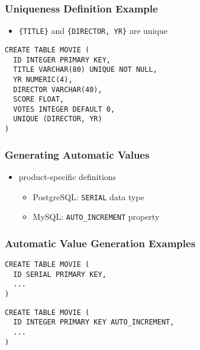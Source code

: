 \documentclass[dvipsnames]{beamer}
\theoremstyle{plain}
\begin{document}
\begin{frame}[fragile]
  \frametitle{Uniqueness Definition Example}

  \begin{example}
    \begin{itemize}
      \item \texttt{\{TITLE\}} and \texttt{\{DIRECTOR, YR\}} are unique
    \end{itemize}

    \begin{lstlisting}
CREATE TABLE MOVIE (
  ID INTEGER PRIMARY KEY,
  TITLE VARCHAR(80) UNIQUE NOT NULL,
  YR NUMERIC(4),
  DIRECTOR VARCHAR(40),
  SCORE FLOAT,
  VOTES INTEGER DEFAULT 0,
  UNIQUE (DIRECTOR, YR)
)
    \end{lstlisting}
  \end{example}
\end{frame}

\begin{frame}[fragile]
  \frametitle{Generating Automatic Values}

  \begin{itemize}
    \item product-specific definitions
    \begin{itemize}
      \item PostgreSQL: \texttt{SERIAL} data type
      \item MySQL: \texttt{AUTO\_INCREMENT} property
    \end{itemize}
  \end{itemize}
\end{frame}

\begin{frame}[fragile]
  \frametitle{Automatic Value Generation Examples}

  \begin{example}[PostgreSQL]
    \begin{lstlisting}
CREATE TABLE MOVIE (
  ID SERIAL PRIMARY KEY,
  ...
)
    \end{lstlisting}
  \end{example}

  \pause
  \begin{example}[MySQL]
    \begin{lstlisting}
CREATE TABLE MOVIE (
  ID INTEGER PRIMARY KEY AUTO_INCREMENT,
  ...
)
    \end{lstlisting}
  \end{example}
\end{frame}
\end{document}
